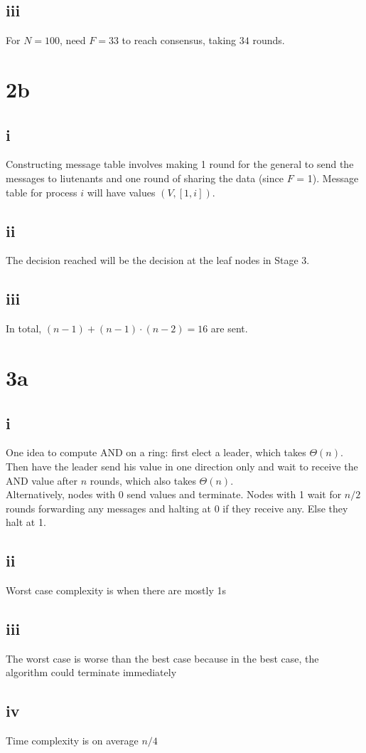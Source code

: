 \documentclass[a4paper,10pt,]{report}
\begin{document}
\subsection{iii}
For $N=100$, need $F = 33$ to reach consensus, taking $34$ rounds.
\section{2b}
\subsection{i}
Constructing message table involves making 1 round for the general to send the messages to liutenants and one round of sharing the data (since $F$ = 1).  Message table for process $i$ will have values $(V, [1, i])$.  
\subsection{ii}
The decision reached will be the decision at the leaf nodes in Stage 3.
\subsection{iii}
In total, $(n-1) + (n-1)\cdot (n-2) = 16$ are sent.
\section{3a}
\subsection{i}
One idea to compute AND on a ring:  first elect a leader, which takes $\Theta(n)$.  Then have the leader send his value in one direction only and wait to receive the AND value after $n$ rounds, which also takes $\Theta(n)$. \\
Alternatively, nodes with 0 send values and terminate.  Nodes with 1 wait for $n/2$ rounds forwarding any messages and halting at 0 if they receive any.  Else they halt at 1.
\subsection{ii}
Worst case complexity is when there are mostly 1s
\subsection{iii}
The worst case is worse than the best case because in the best case, the algorithm could terminate immediately
\subsection{iv}
Time complexity is on average $n/4$
\end{document}
